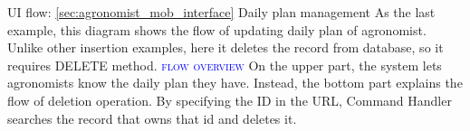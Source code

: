 UI flow: {\ref{sec:agronomist_mob_interface} Daily plan management}
\newline
\newline
As the last example, this diagram shows the flow of updating daily plan of agronomist.
Unlike other insertion examples, here it deletes the record from database, so it requires DELETE method.
\newline
\newline
\textsc{\textcolor{blue}{flow overview}}
\newline
On the upper part, the system lets agronomists know the daily plan they have. Instead, the bottom part explains the flow of deletion operation. By specifying the ID in the URL, Command Handler searches the record that owns that id and deletes it.